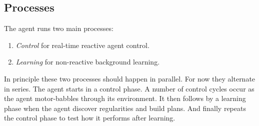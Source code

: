 \documentclass[runningheads]{llncs}
\begin{document}
\subsection{Processes}
The agent runs two main processes:
\begin{enumerate}
\item \emph{Control} for real-time reactive agent control.
\item \emph{Learning} for non-reactive background learning.
\end{enumerate}
In principle these two processes should happen in parallel.  For now
they alternate in series.  The agent starts in a control phase.  A
number of control cycles occur as the agent motor-babbles through its
environment.  It then follows by a learning phase when the agent
discover regularities and build plans.  And finally repeats the
control phase to test how it performs after learning.
\end{document}
